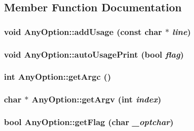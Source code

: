 \subsection{Member Function Documentation}
\hypertarget{classAnyOption_ad0c5643f303324e20754455d58ff2ff0}{
\subsubsection[{addUsage}]{\setlength{\rightskip}{0pt plus 5cm}void AnyOption::addUsage (const char $\ast$ {\em line})}}
\label{classAnyOption_ad0c5643f303324e20754455d58ff2ff0}
\hypertarget{classAnyOption_ab41d990eb6cbe95fbab17e4f961fb365}{
\subsubsection[{autoUsagePrint}]{\setlength{\rightskip}{0pt plus 5cm}void AnyOption::autoUsagePrint (bool {\em flag})}}
\label{classAnyOption_ab41d990eb6cbe95fbab17e4f961fb365}
\hypertarget{classAnyOption_a59fd57b36dc2626d49926e7424d5b695}{
\subsubsection[{getArgc}]{\setlength{\rightskip}{0pt plus 5cm}int AnyOption::getArgc ()}}
\label{classAnyOption_a59fd57b36dc2626d49926e7424d5b695}
\hypertarget{classAnyOption_acd1e384bfe595be9e4b8cd27cf400643}{
\subsubsection[{getArgv}]{\setlength{\rightskip}{0pt plus 5cm}char $\ast$ AnyOption::getArgv (int {\em index})}}
\label{classAnyOption_acd1e384bfe595be9e4b8cd27cf400643}
\hypertarget{classAnyOption_a955d685485036fabc3cedde66f441978}{
\subsubsection[{getFlag}]{\setlength{\rightskip}{0pt plus 5cm}bool AnyOption::getFlag (char {\em \_\-optchar})}}
